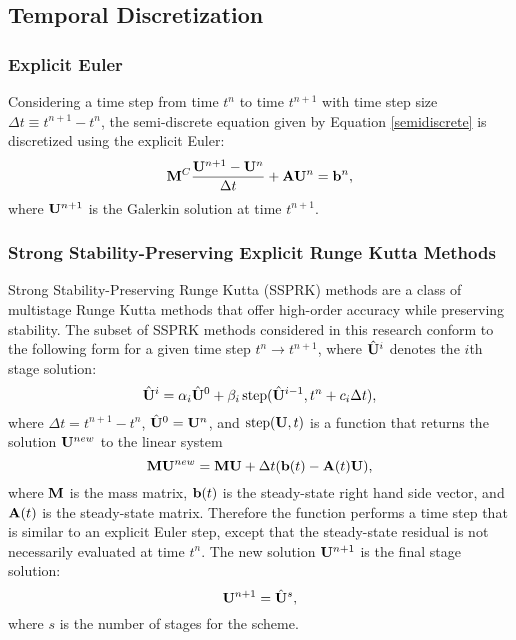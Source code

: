 \subsection{Temporal Discretization}
\subsubsection{Explicit Euler}
Considering a time step from time $t^n$ to time $t^{n+1}$ with time step size
$\Delta t\equiv t^{n+1}-t^n$, the semi-discrete equation given by Equation
\eqref{semidiscrete} is discretized using the explicit Euler:
\begin{equation}\label{galerkin_FE}
   \mathbf{M}^C\frac{\mathbf{U}^{n+1}-\mathbf{U}^n}{\Delta t} + \mathbf{A}\mathbf{U}^n = \mathbf{b}^n,
\end{equation}
where $\mathbf{U}^{n+1}$ is the Galerkin solution at time $t^{n+1}$.
\subsubsection{Strong Stability-Preserving Explicit Runge Kutta Methods}
\label{ssprk}
Strong Stability-Preserving Runge Kutta (SSPRK) methods are a class of multistage
Runge Kutta methods that offer high-order accuracy while preserving stability.
The subset of SSPRK methods considered in this research conform to the
following form for a given time step $t^n\rightarrow t^{n+1}$,
where $\hat{\mathbf{U}}^i$ denotes the $i$th stage solution:
\begin{equation}
   \hat{\mathbf{U}}^i = \alpha_i\hat{\mathbf{U}}^0
   + \beta_i\,\mbox{step}(\hat{\mathbf{U}}^{i-1},t^n+c_i\Delta t),
\end{equation}
where $\Delta t=t^{n+1}-t^n$, $\hat{\mathbf{U}}^0=\mathbf{U}^n$,
and $\mbox{step}(\mathbf{U},t)$
is a function that returns the solution $\mathbf{U}^{new}$ to the linear system
\begin{equation}
   \mathbf{M}\mathbf{U}^{new} = \mathbf{M}\mathbf{U}
   + \Delta t(\mathbf{b}(t) - \mathbf{A}(t)\mathbf{U}),
\end{equation}
where $\mathbf{M}$ is the mass matrix, $\mathbf{b}(t)$ is the steady-state
right hand side vector, and $\mathbf{A}(t)$ is the steady-state matrix.
Therefore the function performs a time step that is similar to an
explicit Euler step, except that the steady-state residual is not
necessarily evaluated at time $t^n$. The new solution $\mathbf{U}^{n+1}$
is the final stage solution:
\begin{equation}
   \mathbf{U}^{n+1} = \hat{\mathbf{U}}^s,
\end{equation}
where $s$ is the number of stages for the scheme.

